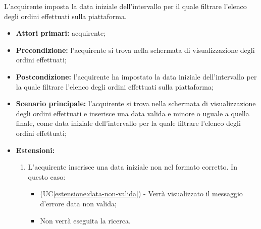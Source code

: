 \label{filtro-temporale-ordini-acquirente.data-iniziale}

L'acquirente imposta la data iniziale dell'intervallo per il quale filtrare l'elenco degli ordini effettuati sulla piattaforma.
\begin{itemize}
    \item \textbf{Attori primari:} acquirente;
    \item \textbf{Precondizione:} l'acquirente si trova nella schermata di visualizzazione degli ordini effettuati;
    \item \textbf{Postcondizione:} l'acquirente ha impostato la data iniziale dell'intervallo per la quale filtrare l'elenco degli ordini effettuati sulla piattaforma;
    \item \textbf{Scenario principale:} l'acquirente si trova nella schermata di visualizzazione degli ordini effettuati e inserisce una data valida e minore o uguale a quella finale, come data iniziale dell'intervallo per la quale filtrare l'elenco degli ordini effettuati;
    \item \textbf{Estensioni:}
    \begin{enumerate}[label=\lett]
        \item L'acquirente inserisce una data iniziale non nel formato corretto. In questo caso:
        \begin{itemize}
            \item (UC\ref{estensione:data-non-valida}) - Verrà visualizzato il messaggio d'errore data non valida;
            \item Non verrà eseguita la ricerca.
        \end{itemize} 
    \end{enumerate}
\end{itemize}

\label{filtro-temporale-ordini-acquirente.data-finale}

